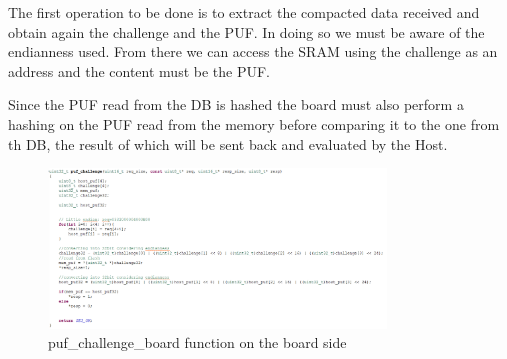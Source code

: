 The first operation to be done is to extract the compacted data received and obtain again the challenge and the PUF. In doing so we must be aware of the endianness used. From there we can access the SRAM using the challenge as an address and the content must be the PUF.

Since the PUF read from the DB is hashed the board must also perform a hashing on the PUF read from the memory before comparing it to the one from th DB, the result of which will be sent back and evaluated by the Host.

\begin{figure}[h!]
	\vspace{0.5cm}
	\includegraphics[width = 0.8\textwidth]{images/puf_challenge_board.png}
	\caption{puf\_challenge\_board function on the board side}
	\label{fig:puf_challenge_board}
\end{figure}
